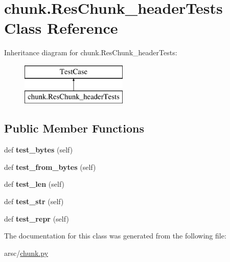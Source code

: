 \hypertarget{classchunk_1_1ResChunk__headerTests}{}\section{chunk.\+Res\+Chunk\+\_\+header\+Tests Class Reference}
\label{classchunk_1_1ResChunk__headerTests}
Inheritance diagram for chunk.\+Res\+Chunk\+\_\+header\+Tests\+:\begin{figure}[H]
\begin{center}
\leavevmode
\includegraphics[height=2.000000cm]{classchunk_1_1ResChunk__headerTests}
\end{center}
\end{figure}
\subsection*{Public Member Functions}
\begin{DoxyCompactItemize}
\item 
\mbox{\label{classchunk_1_1ResChunk__headerTests_a969d20497ce86453ba1de67825a41675}} 
def {\bfseries test\+\_\+bytes} (self)
\item 
\mbox{\label{classchunk_1_1ResChunk__headerTests_a48140912265acfe3244a5b28b0c97419}} 
def {\bfseries test\+\_\+from\+\_\+bytes} (self)
\item 
\mbox{\label{classchunk_1_1ResChunk__headerTests_a35f3843381e9b3e9aadf6ea3f44c2763}} 
def {\bfseries test\+\_\+len} (self)
\item 
\mbox{\label{classchunk_1_1ResChunk__headerTests_aae9047947599199bb71c37c821cdff04}} 
def {\bfseries test\+\_\+str} (self)
\item 
\mbox{\label{classchunk_1_1ResChunk__headerTests_a389b060e57c402f3002da6e81c152fd9}} 
def {\bfseries test\+\_\+repr} (self)
\end{DoxyCompactItemize}


The documentation for this class was generated from the following file\+:\begin{DoxyCompactItemize}
\item 
arsc/\mbox{\hyperlink{chunk_8py}{chunk.\+py}}\end{DoxyCompactItemize}
